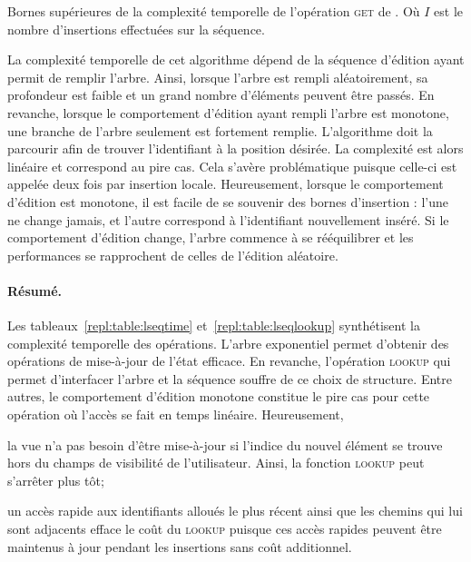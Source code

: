\begin{table}
  \begin{center}
    \caption{\label{repl:table:lseqlookup} Bornes supérieures de la complexité
      temporelle de l'opération \textsc{get} de \LSEQ. Où $I$ est le nombre
      d'insertions effectuées sur la séquence.}
    
  \end{center}
\end{table}

La complexité temporelle de cet algorithme dépend de la séquence d'édition ayant
permit de remplir l'arbre. Ainsi, lorsque l'arbre est rempli aléatoirement, sa
profondeur est faible et un grand nombre d'éléments peuvent être passés. En
revanche, lorsque le comportement d'édition ayant rempli l'arbre est monotone,
une branche de l'arbre seulement est fortement remplie. L'algorithme doit la
parcourir afin de trouver l'identifiant à la position désirée. La complexité est
alors linéaire et correspond au pire cas. Cela s'avère problématique puisque
celle-ci est appelée deux fois par insertion locale. Heureusement, lorsque le
comportement d'édition est monotone, il est facile de se souvenir des bornes
d'insertion : l'une ne change jamais, et l'autre correspond à l'identifiant
nouvellement inséré. Si le comportement d'édition change, l'arbre commence à se
rééquilibrer et les performances se rapprochent de celles de l'édition
aléatoire.

\paragraph{Résumé.} Les tableaux~\ref{repl:table:lseqtime}
et~\ref{repl:table:lseqlookup} synthétisent la complexité temporelle des
opérations. L'arbre exponentiel permet d'obtenir des opérations de mise-à-jour
de l'état efficace. En revanche, l'opération \textsc{lookup} qui permet
d'interfacer l'arbre et la séquence souffre de ce choix de structure. Entre
autres, le comportement d'édition monotone constitue le pire cas pour cette
opération où l'accès se fait en temps linéaire. Heureusement, 
\begin{inparaenum}[(i)]
\item la vue n'a pas besoin d'être mise-à-jour si l'indice du nouvel élément se
  trouve hors du champs de visibilité de l'utilisateur. Ainsi, la fonction
  \textsc{lookup} peut s'arrêter plus tôt;
\item un accès rapide aux identifiants alloués le plus récent ainsi que les
  chemins qui lui sont adjacents efface le coût du \textsc{lookup} puisque ces
  accès rapides peuvent être maintenus à jour pendant les insertions sans coût
  additionnel.
\end{inparaenum}

